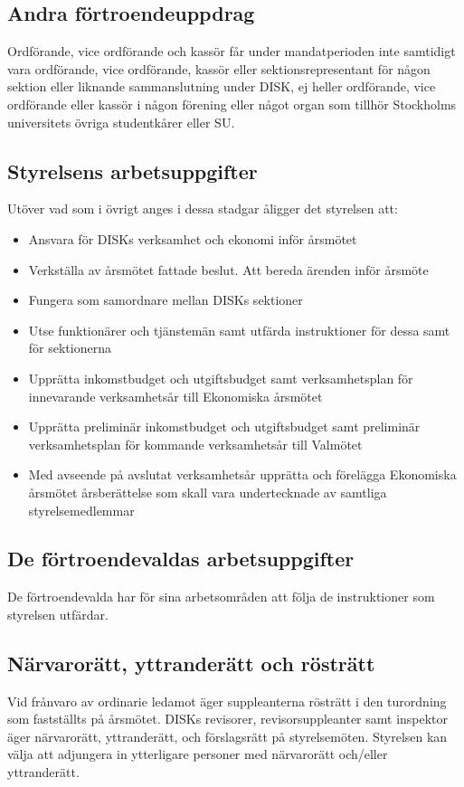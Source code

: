 	\subsection{Andra förtroendeuppdrag}
	\label{subsec:andrafortroendeuppdrag}
		Ordförande, vice ordförande och kassör får under mandatperioden inte samtidigt vara ordförande, vice ordförande, kassör eller sektionsrepresentant för någon sektion eller liknande sammanslutning under DISK, ej heller ordförande, vice ordförande eller kassör i någon förening eller något organ som tillhör Stockholms universitets övriga studentkårer eller SU.

	\subsection{Styrelsens arbetsuppgifter}
	\label{subsec:styrelsensarbetsuppgifter}
		Utöver vad som i övrigt anges i dessa stadgar åligger det styrelsen att:
		\begin{itemize}
		\setlength{\itemsep}{0.0cm}
		\setlength{\parskip}{0.0cm}
			\item Ansvara för DISKs verksamhet och ekonomi inför årsmötet
			\item Verkställa av årsmötet fattade beslut. Att bereda ärenden inför årsmöte
			\item Fungera som samordnare mellan DISKs sektioner
			\item Utse funktionärer och tjänstemän samt utfärda instruktioner för dessa samt för sektionerna
			\item Upprätta inkomstbudget och utgiftsbudget samt verksamhetsplan för innevarande verksamhetsår till Ekonomiska årsmötet
			\item Upprätta preliminär inkomstbudget och utgiftsbudget samt preliminär verksamhetsplan för kommande verksamhetsår till Valmötet
			\item Med avseende på avslutat verksamhetsår upprätta och förelägga Ekonomiska årsmötet årsberättelse som skall vara undertecknade av samtliga styrelsemedlemmar
		\end{itemize}

\clearpage
	\subsection{De förtroendevaldas arbetsuppgifter}
	\label{subsec:defortroendevaldasarbetsuppgifter}
		De förtroendevalda har för sina arbetsområden att följa de instruktioner som styrelsen utfärdar.

	\subsection{Närvarorätt, yttranderätt och rösträtt}
	\label{subsec:narvarorattyttranderattochrostratt}
		Vid frånvaro av ordinarie ledamot äger suppleanterna rösträtt i den turordning som fastställts på årsmötet. DISKs revisorer, revisorsuppleanter samt inspektor äger närvarorätt, yttranderätt, och förslagsrätt på styrelsemöten. Styrelsen kan välja att adjungera in ytterligare personer med närvarorätt och/eller yttranderätt.

